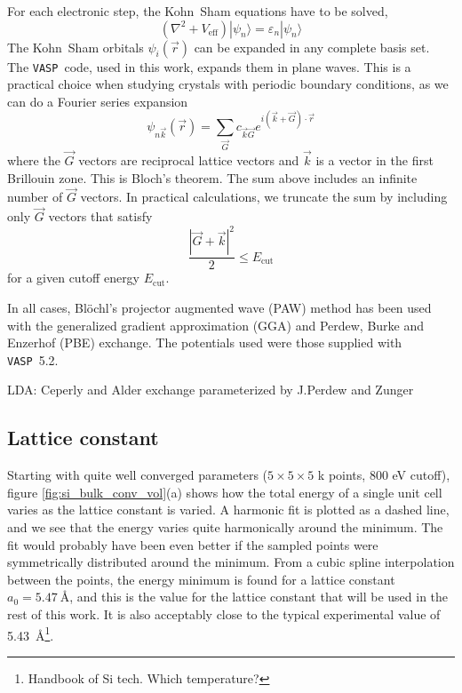 \documentclass[11pt,bibliography=totoc,index=totoc]{scrbook}   %
\newcommand{\vasp}{{\texttt{VASP}}} %
\begin{document}
For each electronic step, the Kohn~Sham equations have to be solved,
\begin{equation}
  (\nabla^2 + V_{\text{eff}}) |\psi_n\rangle = \varepsilon_n |\psi_n\rangle
\end{equation}
The Kohn~Sham orbitals $\psi_i(\vec{r})$ can be expanded in any complete basis set. 
The \vasp\ code, used in this work, expands them in plane waves. 
This is a practical choice when studying crystals with periodic boundary conditions, as we can do a Fourier series expansion
\begin{equation}
  \psi_{n\vec{k}}(\vec{r}) = \sum_{\vec{G}} c_{\vec{k}\vec{G}} e^{i(\vec{k}+\vec{G})\cdot\vec{r}}
\end{equation}
where the $\vec{G}$ vectors are reciprocal lattice vectors and $\vec{k}$ is a vector in the first Brillouin zone.
This is Bloch's theorem. The sum above includes an infinite number of $\vec{G}$ vectors. In practical calculations, we
truncate the sum by including only $\vec{G}$ vectors that satisfy
\begin{equation}
  \frac{|\vec{G}+\vec{k}|^2}{2} \leq E_{\text{cut}}
\end{equation}
for a given cutoff energy $E_{\text{cut}}$.

In all cases, Blöchl's projector augmented wave (PAW) method\cite{Blochl:1994,Kresse:1999} has been used with the generalized gradient approximation (GGA) 
and Perdew, Burke and Enzerhof (PBE) exchange. The potentials used were those supplied with \vasp\ 5.2.


LDA: Ceperly and Alder exchange parameterized by J.Perdew and Zunger

\subsection{Lattice constant}

Starting with quite well converged parameters ($5\times 5\times 5$ k points, 800 eV cutoff), figure \ref{fig:si_bulk_conv_vol}(a) shows how the total energy of a single unit cell varies as the lattice constant is varied. 
A harmonic fit is plotted as a dashed line, and we see that the energy varies quite harmonically around the minimum.
The fit would probably have been even better if the sampled points were symmetrically distributed around the minimum. 
From a cubic spline interpolation between the points, the energy minimum is found for a lattice constant $a_0=\SI{5.47}{\angstrom}$, 
and this is the value for the lattice constant that will be used in the rest of this work. 
It is also acceptably close to the typical experimental value of \SI{5.43}{\angstrom}\footnote{Handbook of Si tech. Which temperature?}. 
\end{document}
